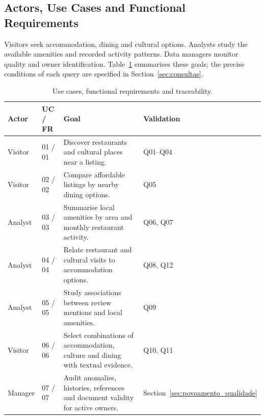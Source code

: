 \subsection{Actors, Use Cases and Functional Requirements}
Visitors seek accommodation, dining and cultural options. Analysts study the available amenities and recorded activity patterns. Data managers monitor quality and owner identification. Table~\ref{tab:atores_casos_uso} summarises these goals; the precise conditions of each query are specified in Section~\ref{sec:consultas}.

\begin{table}[!htbp]
\centering\footnotesize
\setlength{\tabcolsep}{4pt}\renewcommand{\arraystretch}{1.1}
\caption{Use cases, functional requirements and traceability.}\label{tab:atores_casos_uso}
\begin{tabularx}{\textwidth}{p{2cm}lX p{2cm}}
\toprule
\textbf{Actor} & \textbf{UC / FR} & \textbf{Goal} & \textbf{Validation} \\
\midrule
Visitor & 01 / 01 & Discover restaurants and cultural places near a listing. & Q01--Q04 \\
Visitor & 02 / 02 & Compare affordable listings by nearby dining options. & Q05 \\
Analyst & 03 / 03 & Summarise local amenities by area and monthly restaurant activity. & Q06, Q07 \\
Analyst & 04 / 04 & Relate restaurant and cultural visits to accommodation options. & Q08, Q12 \\
Analyst & 05 / 05 & Study associations between review mentions and local amenities. & Q09 \\
Visitor & 06 / 06 & Select combinations of accommodation, culture and dining with textual evidence. & Q10, Q11 \\
Manager & 07 / 07 & Audit anomalies, histories, references and document validity for active owners. & Section~\ref{sec:povoamento_qualidade} \\
\bottomrule
\end{tabularx}
\end{table}

